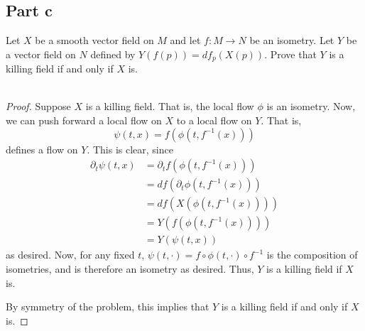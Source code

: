 \documentclass[fontsize=11pt]{scrartcl} %
\numberwithin{equation}{section} %
\numberwithin{figure}{section} %
\numberwithin{table}{section} %
\begin{document}
\subsection*{Part c}
Let $X$ be a smooth vector field on $M$ and let $f:M\to N$ be an isometry. Let
$Y$ be a vector field on $N$ defined by $Y(f(p))=df_p(X(p))$. Prove that $Y$ is
a killing field if and only if $X$ is.
\\
\\
\begin{proof}
    Suppose $X$ is a killing field. That is, the local flow $\phi$ is an
    isometry. Now, we can push forward a local flow on $X$ to a local flow on
    $Y$. That is,
    \[
        \psi(t,x) = f(\phi(t,f^{-1}(x)))
    \]
    defines a flow on $Y$. This is clear, since
    \[
        \begin{aligned}
        \partial_t\psi(t,x) &= \partial_t f(\phi(t,f^{-1}(x)))\\
        &= df(\partial_t\phi(t,f^{-1}(x)))\\
        &= df(X(\phi(t,f^{-1}(x))))\\
        &= Y(f(\phi(t,f^{-1}(x))))\\
        &= Y(\psi(t,x))
    \end{aligned}
    \]
    as desired. Now, for any fixed $t$, $\psi(t,\cdot) =
    f\circ\phi(t,\cdot)\circ f^{-1}$ is the composition of isometries, and is
    therefore an isometry as desired. Thus, $Y$ is a killing field if $X$ is.

    By symmetry of the problem, this implies that $Y$ is a killing field if and
    only if $X$ is.
\end{proof}
\end{document}
